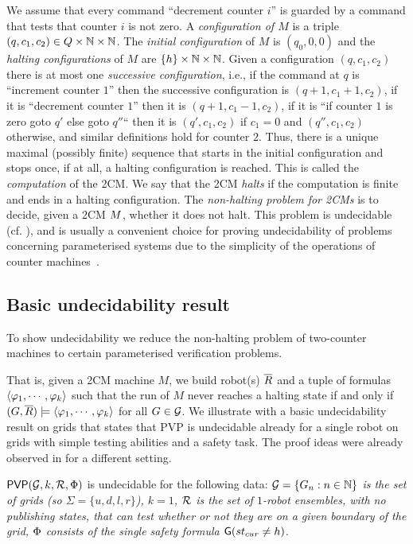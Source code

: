 We assume that every command ``decrement counter $i$'' is guarded by a command that tests that counter $i$ is not zero.
A \emph{configuration of $M$} is a triple $(q,c_1,c_2) \in Q \times \mathbb{N} \times \mathbb{N}$. The \emph{initial configuration} of $M$ is $(q_0,0,0)$ and the \emph{halting configurations} of $M$ are $\{h\} \times \mathbb{N} \times \mathbb{N}$.  Given a configuration $(q,c_1,c_2)$ there is at most one \emph{successive configuration}, i.e., if the command at $q$ is ``increment counter $1$'' then the successive configuration is $(q+1,c_1+1,c_2)$, if it is ``decrement counter $1$'' then it is $(q+1,c_1-1,c_2)$, if it is ``if counter $1$ is zero goto $q'$ else goto $q''$`` then it is $(q',c_1,c_2)$ if $c_1 = 0$ and $(q'',c_1,c_2)$ otherwise, and similar definitions hold for counter $2$. Thus, there is a unique maximal (possibly finite) sequence that starts in the initial configuration and stops once, if at all, a halting configuration is reached. This is called the \emph{computation} of the 2CM. We say that the 2CM \emph{halts} if the computation is finite and ends in a halting configuration.
The \emph{non-halting problem for 2CMs} is to decide, given a 2CM $M$, whether it does not halt. This problem is undecidable (cf. \cite{Minsky67}), and is usually a convenient choice for proving undecidability of problems concerning parameterised systems due to the simplicity of the operations of counter machines~\cite{Emerso03,AJKR14,DBLP:conf/cade/AminofR16}.

\subsection{Basic undecidability result}
To show undecidability we reduce the non-halting problem of two-counter machines to certain parameterised verification problems.

That is, given a 2CM machine $M$, we build robot(s) $\overline{R}$ and a tuple of formulas $\langle {\varphi_1,\cdots,\varphi_k} \rangle$
such that the run of $M$ never reaches a halting state if and only if
$(G,\overline{R}) \models \langle {\varphi_1,\cdots,\varphi_k} \rangle$ for all $G \in \mathcal{G}$. We illustrate with a basic undecidability result on grids that states that
PVP is undecidable already for a single robot on grids with simple testing abilities and a safety task.
The proof ideas were already observed in \cite{BlHe67} for a different setting.


\begin{theorem} \label{thm:undec-1robotgrid}
$\mathsf{PVP}(\mathcal{G},k,\mathcal{R},\Phi)$ is undecidable for the following data:
\it
\- $\mathcal{G} = \{G_n : n \in \mathbb{N}\}$ is the set of grids (so $\Sigma = \{u,d,l,r\}$),
\- $k = 1$,
\- $\mathcal{R}$ is the set of $1$-robot ensembles, with no publishing states, that can test whether or not they are on a given boundary of the grid,
\- $\Phi$ consists of the single safety formula $\operatorname{\mathsf{G}} (st_{cur}  \neq h)$.
\ti
\end{theorem}



